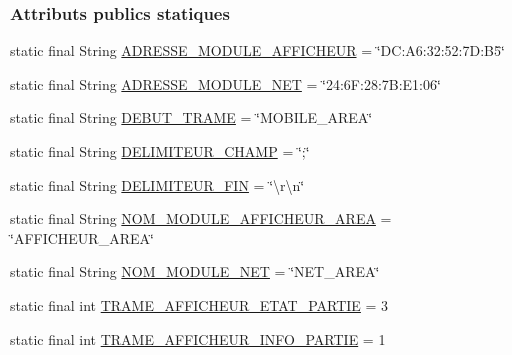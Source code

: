\subsubsection*{Attributs publics statiques}
\begin{DoxyCompactItemize}
\item 
static final String \hyperlink{classcom_1_1example_1_1area_1_1_protocol_a_r_e_a_a5f26c701d9ee639249d7f11e0b87b72d}{A\+D\+R\+E\+S\+S\+E\+\_\+\+M\+O\+D\+U\+L\+E\+\_\+\+A\+F\+F\+I\+C\+H\+E\+UR} = \char`\"{}D\+C\+:\+A6\+:32\+:52\+:7\+D\+:\+B5\char`\"{}
\item 
static final String \hyperlink{classcom_1_1example_1_1area_1_1_protocol_a_r_e_a_a57f9d1bae3c42517827ff0f193f0f36f}{A\+D\+R\+E\+S\+S\+E\+\_\+\+M\+O\+D\+U\+L\+E\+\_\+\+N\+ET} = \char`\"{}24\+:6\+F\+:28\+:7\+B\+:\+E1\+:06\char`\"{}
\item 
static final String \hyperlink{classcom_1_1example_1_1area_1_1_protocol_a_r_e_a_ad9aa917d162b8de3234b65ba294803ee}{D\+E\+B\+U\+T\+\_\+\+T\+R\+A\+ME} = \char`\"{}M\+O\+B\+I\+L\+E\+\_\+\+A\+R\+EA\char`\"{}
\item 
static final String \hyperlink{classcom_1_1example_1_1area_1_1_protocol_a_r_e_a_afec644c1c2a6563a0ee16a689044433c}{D\+E\+L\+I\+M\+I\+T\+E\+U\+R\+\_\+\+C\+H\+A\+MP} = \char`\"{};\char`\"{}
\item 
static final String \hyperlink{classcom_1_1example_1_1area_1_1_protocol_a_r_e_a_a77f13634749dc65bc24d98672ff7ba03}{D\+E\+L\+I\+M\+I\+T\+E\+U\+R\+\_\+\+F\+IN} = \char`\"{}\textbackslash{}r\textbackslash{}n\char`\"{}
\item 
static final String \hyperlink{classcom_1_1example_1_1area_1_1_protocol_a_r_e_a_afdfe4064c9e2d1c013bce83fd03c4326}{N\+O\+M\+\_\+\+M\+O\+D\+U\+L\+E\+\_\+\+A\+F\+F\+I\+C\+H\+E\+U\+R\+\_\+\+A\+R\+EA} = \char`\"{}A\+F\+F\+I\+C\+H\+E\+U\+R\+\_\+\+A\+R\+EA\char`\"{}
\item 
static final String \hyperlink{classcom_1_1example_1_1area_1_1_protocol_a_r_e_a_a77e082eb863a4839d0f1e885b31594e2}{N\+O\+M\+\_\+\+M\+O\+D\+U\+L\+E\+\_\+\+N\+ET} = \char`\"{}N\+E\+T\+\_\+\+A\+R\+EA\char`\"{}
\item 
static final int \hyperlink{classcom_1_1example_1_1area_1_1_protocol_a_r_e_a_a685ef5127e28517ca42fafb5cd6ba25a}{T\+R\+A\+M\+E\+\_\+\+A\+F\+F\+I\+C\+H\+E\+U\+R\+\_\+\+E\+T\+A\+T\+\_\+\+P\+A\+R\+T\+IE} = 3
\item 
static final int \hyperlink{classcom_1_1example_1_1area_1_1_protocol_a_r_e_a_a4f5be4d0653ad5f52ae5f5c673ec728d}{T\+R\+A\+M\+E\+\_\+\+A\+F\+F\+I\+C\+H\+E\+U\+R\+\_\+\+I\+N\+F\+O\+\_\+\+P\+A\+R\+T\+IE} = 1

\end{DoxyCompactItemize}
